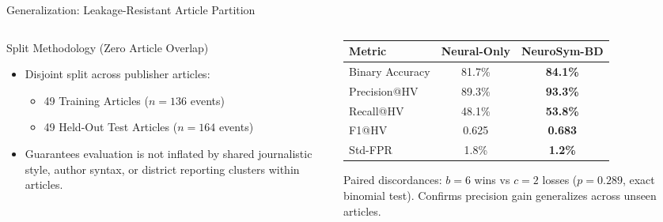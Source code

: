 \documentclass[aspectratio=169, 10pt]{beamer}
\begin{document}
\begin{frame}{Generalization: Leakage-Resistant Article Partition}
  \begin{columns}[T]
    \begin{column}{0.48\textwidth}
      \begin{block}{Split Methodology (Zero Article Overlap)}
        \begin{itemize}
          \item Disjoint split across publisher articles:
            \begin{itemize}
              \item 49 Training Articles ($n=136$ events)
              \item 49 Held-Out Test Articles ($n=164$ events)
            \end{itemize}
          \item Guarantees evaluation is not inflated by shared journalistic style, author syntax, or district reporting clusters within articles.
        \end{itemize}
      \end{block}
    \end{column}
    \begin{column}{0.48\textwidth}
      \begin{table}[h]
        \centering
        \footnotesize
        \begin{tabular}{lcc}
          \toprule
          \textbf{Metric} & \textbf{Neural-Only} & \textbf{NeuroSym-BD} \\
          \midrule
          Binary Accuracy & 81.7\% & \textbf{84.1\%} \\
          Precision@HV    & 89.3\% & \textbf{93.3\%} \\
          Recall@HV       & 48.1\% & \textbf{53.8\%} \\
          F1@HV           & 0.625  & \textbf{0.683} \\
          Std-FPR         & 1.8\%  & \textbf{1.2\%} \\
          \bottomrule
        \end{tabular}
      \end{table}
      \vspace{0.3em}
      \small
      Paired discordances: $b=6$ wins vs $c=2$ losses ($p = 0.289$, exact binomial test). Confirms precision gain generalizes across unseen articles.
    \end{column}
  \end{columns}
\end{frame}
\end{document}
